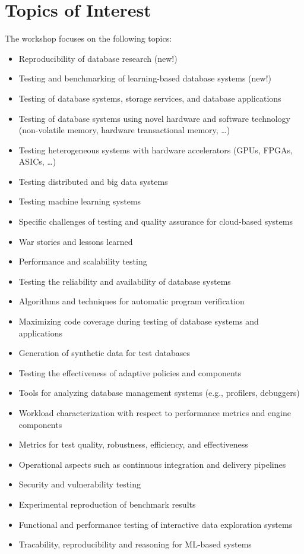 \documentclass[sigconf]{acmart}
\begin{document}
\section{Topics of Interest}
The workshop focuses on the following topics:
\begin{itemize}
    \item Reproducibility of database research (new!)
	\item Testing and benchmarking of learning-based database systems (new!)
	\item Testing of database systems, storage services, and database applications
	\item Testing of database systems using novel hardware and software technology (non-volatile memory, hardware transactional memory, …)
	\item Testing heterogeneous systems with hardware accelerators (GPUs, FPGAs, ASICs, …)
	\item Testing distributed and big data systems
	\item Testing machine learning systems
	\item Specific challenges of testing and quality assurance for cloud-based systems
	\item War stories and lessons learned
	\item Performance and scalability testing
	\item Testing the reliability and availability of database systems
	\item Algorithms and techniques for automatic program verification
	\item Maximizing code coverage during testing of database systems and applications
	\item Generation of synthetic data for test databases
	\item Testing the effectiveness of adaptive policies and components
	\item Tools for analyzing database management systems (e.g., profilers, debuggers)
	\item Workload characterization with respect to performance metrics and engine components
	\item Metrics for test quality, robustness, efficiency, and effectiveness
	\item Operational aspects such as continuous integration and delivery pipelines
	\item Security and vulnerability testing
	\item Experimental reproduction of benchmark results
	\item Functional and performance testing of interactive data exploration systems
	\item Tracability, reproducibility and reasoning for ML-based systems
\end{itemize}
\end{document}
